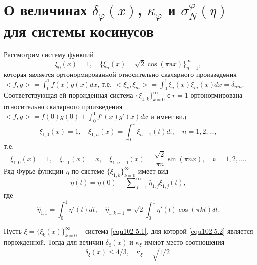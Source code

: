 \section{О величинах $\delta_\varphi(x)$, $\kappa_\varphi$ и $\sigma_N^\varphi(\eta)$ для системы косинусов }


Рассмотрим систему функций
\begin{equation}\label{equ102-5.1}
 \xi_0(x)=1,\quad \{\xi_n(x)=\sqrt{2}\cos(\pi nx)\}_{n=1}^\infty,
 \end{equation}
 которая является ортонормированной относительно скалярного произведения \linebreak $<f,g>=\int_0^1f(x)g(x)dx$, т.е.
$
 <\xi_n,\xi_m>=\int_0^1\xi_n(x)\xi_m(x)dx=\delta_{nm}.
$
Соответствующая ей порожденная система $\{\xi_{1,k}\}_{k=0}^\infty$ с $r=1$ ортонормирована
относительно скалярного произведения $ <f,g>=f(0)g(0)+\int_0^1f'(x)g'(x)dx$
и имеет вид
$$
 \xi_{1,0}(x)=1,\quad \xi_{1,n}(x)=\int_0^x \xi_{n-1}(t)dt, \quad n=1,2,\ldots,
$$
т.е.
\begin{equation}\label{equ102-5.2}
 \xi_{1,0}(x)=1,\quad \xi_{1,1}(x)=x,\quad \xi_{1,n+1}(x)=\frac{\sqrt{2}}{\pi n}\sin(\pi nx),\quad n=1,2,\ldots.
\end{equation}
Ряд Фурье функции $\eta$ по системе $\{\xi_{1,k}\}_{k=0}^\infty$ имеет вид
 \begin{equation}\label{equ102-5.3}
 \eta(t)=\eta(0) +\sum\nolimits_{j=1}^\infty \hat \eta_{1,j}\xi_{1,j}(t),
\end{equation}
где
$$
\hat \eta_{1,1}=\int_{0}^1 \eta'(t)dt,\quad
\hat \eta_{1,k+1}=\sqrt{2}\int_{0}^1 \eta'(t)\cos(\pi kt)dt.
$$
\begin{theorem}\label{equtheo4}
  Пусть $\xi=\{\xi_k(x)\}_{k=0}^\infty$ -- система  \eqref{equ102-5.1}, для которой  \eqref{equ102-5.2} является порожденной. Тогда для величин $\delta_{\xi}(x)$ и    $\kappa_\xi$  имеют место соотношения
 $$
\delta_{\xi}(x)\le 4/3,\quad\kappa_{\xi}=\sqrt{1/2}.
$$
\end{theorem}


